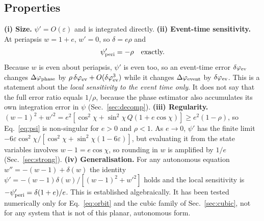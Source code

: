 \documentclass[11pt,a4paper]{article}
\newcommand{\dphi}{\Delta\varphi}
\begin{document}
\subsection{Properties}
\textbf{(i) Size.} $\psi'=O(\varepsilon)$ and is integrated directly.
\textbf{(ii) Event-time sensitivity.} At periapsis $w=1+e$, $w'=0$, so $\delta=e\rho$ and
\begin{equation}
\psi'_{\rm peri}=-\rho\quad\text{exactly.}
\label{eq:sens}
\end{equation}
Because $w$ is even about periapsis, $\psi'$ is even too, so an event-time error $\delta\varphi_{\rm ev}$ changes $\dphi_{\rm phase}$ by $\rho\,\delta\varphi_{\rm ev}+O(\delta\varphi_{\rm ev}^3)$ while it changes $\dphi_{\rm event}$ by $\delta\varphi_{\rm ev}$. This is a statement about the \emph{local sensitivity to the event time only}. It does not say that the full error ratio equals $1/\rho$, because the phase estimator also accumulates its own integration error in $\psi$ (Sec.~\ref{sec:decomp}).
\textbf{(iii) Regularity.} $(w-1)^2+w'^2=e^2\left[\cos^2\chi+\sin^2\chi\,Q(1+e\cos\chi)\right]\ge e^2(1-\rho)$, so Eq.~\eqref{eq:psi} is non-singular for $e>0$ and $\rho<1$. As $e\to0$, $\psi'$ has the finite limit $-6\varepsilon\cos^2\chi/[\cos^2\chi+\sin^2\chi(1-6\varepsilon)]$, but evaluating it from the state variables involves $w-1=e\cos\chi$, so rounding in $w$ is amplified by $1/e$ (Sec.~\ref{sec:strong}).
\textbf{(iv) Generalisation.} For any autonomous equation $w''=-(w-1)+\delta(w)$ the identity $\psi'=-(w-1)\delta(w)/[(w-1)^2+w'^2]$ holds and the local sensitivity is $-\psi'_{\rm peri}=\delta(1+e)/e$. This is established algebraically. It has been tested numerically only for Eq.~\eqref{eq:orbit} and the cubic family of Sec.~\ref{sec:cubic}, not for any system that is not of this planar, autonomous form.
\end{document}
